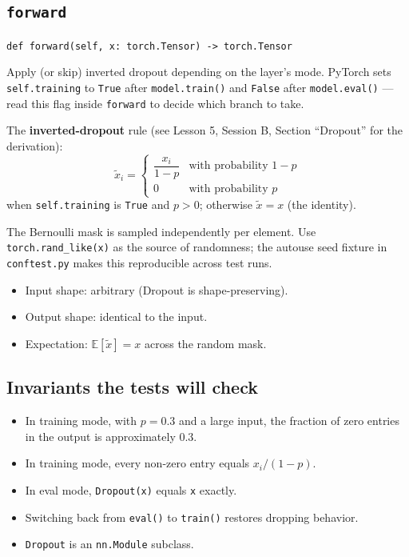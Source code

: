 \documentclass[11pt]{article}
\newcommand{\code}[1]{\texttt{\small #1}}
\begin{document}
\subsection{\texttt{forward}}

\noindent
\code{def forward(self, x: torch.Tensor) -> torch.Tensor}

\medskip\noindent
Apply (or skip) inverted dropout depending on the layer's mode. PyTorch sets
\code{self.training} to \code{True} after \code{model.train()} and
\code{False} after \code{model.eval()} --- read this flag inside
\code{forward} to decide which branch to take.

\medskip\noindent
The \textbf{inverted-dropout} rule (see Lesson 5, Session B, Section
``Dropout'' for the derivation):
\[
    \tilde{x}_i =
    \begin{cases}
        \dfrac{x_i}{1 - p} & \text{with probability } 1 - p \\
        0 & \text{with probability } p
    \end{cases}
\]
when \code{self.training} is \code{True} and $p > 0$; otherwise
$\tilde{x} = x$ (the identity).

\medskip\noindent
The Bernoulli mask is sampled independently per element. Use
\code{torch.rand\_like(x)} as the source of randomness; the autouse seed
fixture in \code{conftest.py} makes this reproducible across test runs.

\begin{itemize}
    \item Input shape: arbitrary (Dropout is shape-preserving).
    \item Output shape: identical to the input.
    \item Expectation: $\mathbb{E}[\tilde{x}] = x$ across the random mask.
\end{itemize}

\subsection*{Invariants the tests will check}

\begin{itemize}
    \item In training mode, with $p = 0.3$ and a large input, the fraction
          of zero entries in the output is approximately $0.3$.
    \item In training mode, every non-zero entry equals $x_i / (1 - p)$.
    \item In eval mode, \code{Dropout(x)} equals \code{x} exactly.
    \item Switching back from \code{eval()} to \code{train()} restores
          dropping behavior.
    \item \code{Dropout} is an \code{nn.Module} subclass.
\end{itemize}
\end{document}
